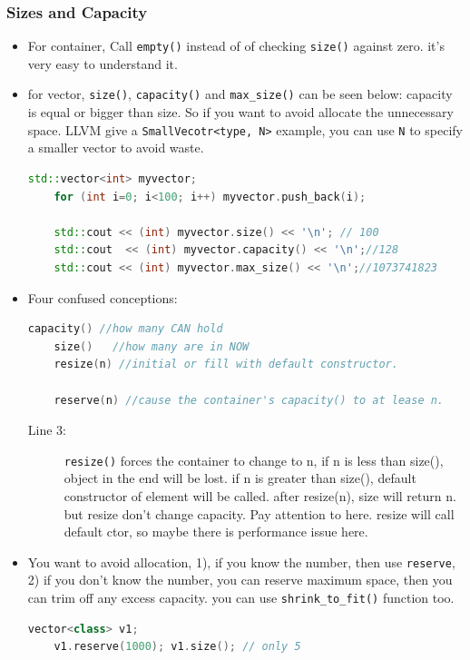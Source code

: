 \documentclass[a4paper,11pt,twoside]{book}
\begin{document}
\subsubsection{Sizes and Capacity}
\begin{itemize}
	\item For container, Call \texttt{empty()} instead of of checking \texttt{size()} against zero. it's very easy to understand it.
	
	\item for vector, \texttt{size()}, \texttt{capacity()} and \texttt{max\_size()} can be seen below: capacity is equal or bigger than size. So if you want to avoid allocate the unnecessary space.  LLVM give a \texttt{SmallVecotr<type, N>} example, you can use \texttt{N} to specify a smaller vector to avoid waste.
\begin{lstlisting}[frame=single, language=c++]
	std::vector<int> myvector;
	for (int i=0; i<100; i++) myvector.push_back(i);
	
	std::cout << (int) myvector.size() << '\n'; // 100
	std::cout  << (int) myvector.capacity() << '\n';//128
	std::cout << (int) myvector.max_size() << '\n';//1073741823
\end{lstlisting}	
	
	
	\item Four confused conceptions:
\begin{lstlisting}[frame=single, language=c++]
	capacity() //how many CAN hold
	size()   //how many are in NOW
	resize(n) //initial or fill with default constructor.
	
	reserve(n) //cause the container's capacity() to at lease n.
\end{lstlisting}	
	\begin{description}
		\item[Line 3:] \texttt{resize()} forces the container to change to n, if n is less than size(),  object in the end will be lost. if n is greater than size(),  default constructor of element will be called. after resize(n), size will return n. but resize don't change capacity. Pay attention to here. resize will call default ctor, so maybe there is performance issue here. 
	\end{description}
	
	\item You want to avoid allocation, 1), if you know the number, then use \texttt{reserve}, 2) if you don't know the number, you can reserve maximum space, then you can trim off any excess capacity.  you can use \texttt{shrink\_to\_fit()} function too. 
\begin{lstlisting}[frame=single, language=c++]
	vector<class> v1;
	v1.reserve(1000); v1.size(); // only 5
	

\end{lstlisting}
\end{itemize}
\end{document}

